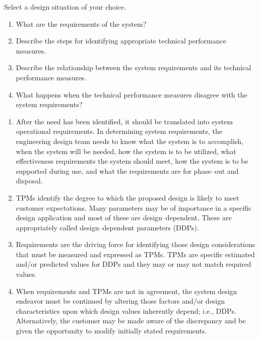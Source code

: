 \begin{exercises}
    \begin{exercise}
    \label{sea-2-15_16}
        Select a design situation of your choice.
        \begin{enumerate}[label=\alph*)]
            \item What are the requirements of the system?
            \item Describe the steps for identifying appropriate technical performance measures.
            \item Describe the relationship between the system requirements and its technical performance measures.
            \item What happens when the technical performance measures disagree with the system requirements?
        \end{enumerate}
    \end{exercise}
    \begin{solution}
        \begin{enumerate}[label=\alph*)]
            \item After the need has been identified, it should be translated into system operational requirements. In determining system requirements, the engineering design team needs to know what the system is to accomplish, when the system will be needed, how the system is to be utilized, what effectiveness requirements the system should meet, how the system is to be supported during use, and what the requirements are for phase–out and disposal.
            \item TPMs identify the degree to which the proposed design is likely to meet customer expectations. Many parameters may be of importance in a specific design application and most of these are design–dependent. These are appropriately called design–dependent parameters (DDPs). 
            \item Requirements are the driving force for identifying those design considerations that must be measured and expressed as TPMs. TPMs are specific estimated and/or predicted values for DDPs and they may or may not match required values. 
            \item When requirements and TPMs are not in agreement, the system design endeavor must be continued by altering those factors and/or design characteristics upon which design values inherently depend; i.e., DDPs. Alternatively, the customer may be made aware of the discrepancy and be given the opportunity to modify initially stated requirements.
        \end{enumerate}
    \end{solution}
    

\end{exercises}
